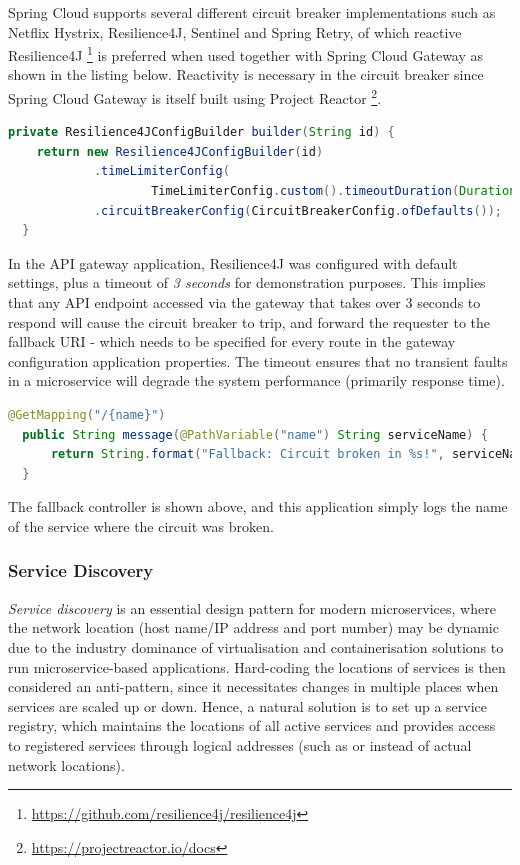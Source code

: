 Spring Cloud supports several different circuit breaker implementations such as Netflix Hystrix, Resilience4J, Sentinel and Spring Retry, of which reactive Resilience4J \footnote{\url{https://github.com/resilience4j/resilience4j}} is preferred when used together with Spring Cloud Gateway as shown in the listing below. Reactivity is necessary in the circuit breaker since Spring Cloud Gateway is itself built using Project Reactor \footnote{\url{https://projectreactor.io/docs}}.

\begin{lstlisting}[language=Java, caption=Circuit breaker configuration in API gateway application.]
  private Resilience4JConfigBuilder builder(String id) {
    return new Resilience4JConfigBuilder(id)
            .timeLimiterConfig(
                    TimeLimiterConfig.custom().timeoutDuration(Duration.ofSeconds(3)).build())
            .circuitBreakerConfig(CircuitBreakerConfig.ofDefaults());
  }
\end{lstlisting}

In the API gateway application, Resilience4J was configured with default settings, plus a timeout of \textit{3 seconds} for demonstration purposes. This implies that any API endpoint accessed via the gateway that takes over 3 seconds to respond will cause the circuit breaker to trip, and forward the requester to the fallback URI - which needs to be specified for every route in the gateway configuration application properties. The timeout ensures that no transient faults in a microservice will degrade the system performance (primarily response time).

\begin{lstlisting}[language=Java, caption=Code snippet from \code{FallbackController.java}.]
  @GetMapping("/{name}")
  public String message(@PathVariable("name") String serviceName) {
      return String.format("Fallback: Circuit broken in %s!", serviceName);
  }
\end{lstlisting}

The fallback controller is shown above, and this application simply logs the name of the service where the circuit was broken.

\subsubsection{Service Discovery}

\textit{Service discovery} is an essential design pattern for modern microservices, where the network location (host name/IP address and port number) may be dynamic due to the industry dominance of virtualisation and containerisation solutions to run microservice-based applications. Hard-coding the locations of services is then considered an anti-pattern, since it necessitates changes in multiple places when services are scaled up or down. Hence, a natural solution is to set up a service registry, which maintains the locations of all active services and provides access to registered services through logical addresses (such as  or  instead of actual network locations).

